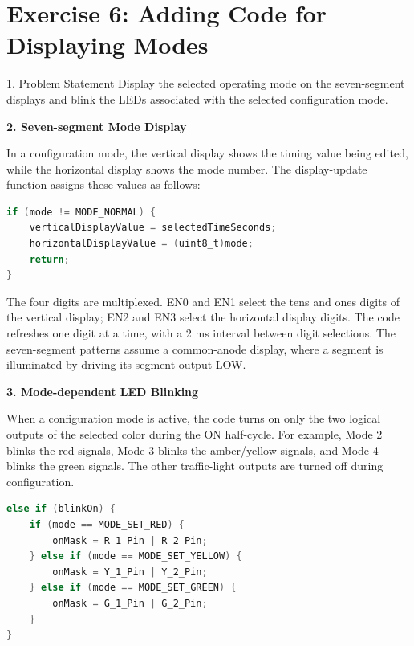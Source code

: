 \clearpage
\section*{Exercise 6: Adding Code for Displaying Modes}

\begin{questionbox}{1. Problem Statement}
Display the selected operating mode on the seven-segment displays and blink the LEDs associated with the selected configuration mode.
\end{questionbox}

\vspace{0.4cm}
\textbf{2. Seven-segment Mode Display}

In a configuration mode, the vertical display shows the timing value being edited, while the horizontal display shows the mode number. The display-update function assigns these values as follows:

\begin{lstlisting}[language=C, caption={Display values in a configuration mode}, label={lst:exercise6_mode_display}, captionpos=b]
if (mode != MODE_NORMAL) {
    verticalDisplayValue = selectedTimeSeconds;
    horizontalDisplayValue = (uint8_t)mode;
    return;
}
\end{lstlisting}

The four digits are multiplexed. EN0 and EN1 select the tens and ones digits of the vertical display; EN2 and EN3 select the horizontal display digits. The code refreshes one digit at a time, with a 2 ms interval between digit selections. The seven-segment patterns assume a common-anode display, where a segment is illuminated by driving its segment output LOW.

\textbf{3. Mode-dependent LED Blinking}

When a configuration mode is active, the code turns on only the two logical outputs of the selected color during the ON half-cycle. For example, Mode 2 blinks the red signals, Mode 3 blinks the amber/yellow signals, and Mode 4 blinks the green signals. The other traffic-light outputs are turned off during configuration.

\begin{lstlisting}[language=C, caption={Selected-color output in configuration modes}, label={lst:exercise6_led_blink}, captionpos=b]
else if (blinkOn) {
    if (mode == MODE_SET_RED) {
        onMask = R_1_Pin | R_2_Pin;
    } else if (mode == MODE_SET_YELLOW) {
        onMask = Y_1_Pin | Y_2_Pin;
    } else if (mode == MODE_SET_GREEN) {
        onMask = G_1_Pin | G_2_Pin;
    }
}
\end{lstlisting}

